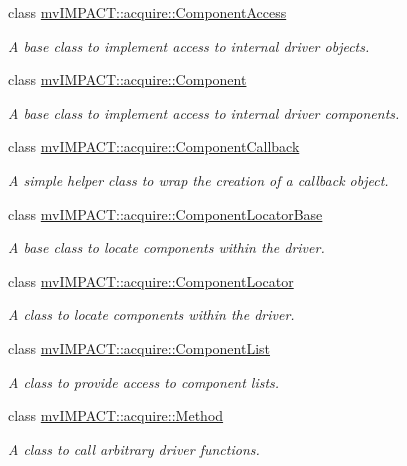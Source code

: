 \begin{DoxyCompactItemize}
class \hyperlink{classmv_i_m_p_a_c_t_1_1acquire_1_1_component_access}{mv\+I\+M\+P\+A\+C\+T\+::acquire\+::\+Component\+Access}
\begin{DoxyCompactList}\small\item\em A base class to implement access to internal driver objects. \end{DoxyCompactList}\item 
class \hyperlink{classmv_i_m_p_a_c_t_1_1acquire_1_1_component}{mv\+I\+M\+P\+A\+C\+T\+::acquire\+::\+Component}
\begin{DoxyCompactList}\small\item\em A base class to implement access to internal driver components. \end{DoxyCompactList}\item 
class \hyperlink{classmv_i_m_p_a_c_t_1_1acquire_1_1_component_callback}{mv\+I\+M\+P\+A\+C\+T\+::acquire\+::\+Component\+Callback}
\begin{DoxyCompactList}\small\item\em A simple helper class to wrap the creation of a callback object. \end{DoxyCompactList}\item 
class \hyperlink{classmv_i_m_p_a_c_t_1_1acquire_1_1_component_locator_base}{mv\+I\+M\+P\+A\+C\+T\+::acquire\+::\+Component\+Locator\+Base}
\begin{DoxyCompactList}\small\item\em A base class to locate components within the driver. \end{DoxyCompactList}\item 
class \hyperlink{classmv_i_m_p_a_c_t_1_1acquire_1_1_component_locator}{mv\+I\+M\+P\+A\+C\+T\+::acquire\+::\+Component\+Locator}
\begin{DoxyCompactList}\small\item\em A class to locate components within the driver. \end{DoxyCompactList}\item 
class \hyperlink{classmv_i_m_p_a_c_t_1_1acquire_1_1_component_list}{mv\+I\+M\+P\+A\+C\+T\+::acquire\+::\+Component\+List}
\begin{DoxyCompactList}\small\item\em A class to provide access to component lists. \end{DoxyCompactList}\item 
class \hyperlink{classmv_i_m_p_a_c_t_1_1acquire_1_1_method}{mv\+I\+M\+P\+A\+C\+T\+::acquire\+::\+Method}
\begin{DoxyCompactList}\small\item\em A class to call arbitrary driver functions. \end{DoxyCompactList}\item 

\end{DoxyCompactItemize}
